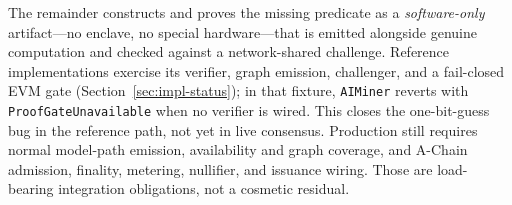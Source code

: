 The remainder constructs and proves the missing predicate as a \emph{software-only}
artifact---no enclave, no special hardware---that is emitted alongside genuine computation
and checked against a network-shared challenge. Reference implementations exercise its
verifier, graph emission, challenger, and a fail-closed EVM gate
(Section~\ref{sec:impl-status}); in that fixture, \texttt{AIMiner} reverts with
\texttt{ProofGateUnavailable} when no verifier is wired. This closes the one-bit-guess bug
in the reference path, not yet in live consensus. Production still requires normal
model-path emission, availability and graph coverage, and A-Chain admission, finality,
metering, nullifier, and issuance wiring. Those are load-bearing integration obligations,
not a cosmetic residual.
